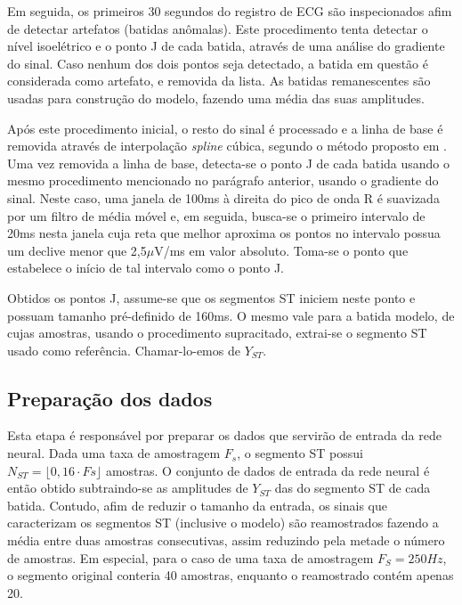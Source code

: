 Em seguida, os primeiros 30 segundos do registro de ECG são inspecionados afim de detectar artefatos (batidas anômalas). Este procedimento tenta detectar o nível isoelétrico e o ponto J de cada batida, através de uma análise do gradiente do sinal. Caso nenhum dos dois pontos seja detectado, a batida em questão é considerada como artefato, e removida da lista. As batidas remanescentes são usadas para construção do modelo, fazendo uma média das suas amplitudes.

Após este procedimento inicial, o resto do sinal é processado e a linha de base é removida através de interpolação \emph{spline} cúbica, segundo o método proposto em \cite{Badilini91}. Uma vez removida a linha de base, detecta-se o ponto J de cada batida usando o mesmo procedimento mencionado no parágrafo anterior, usando o gradiente do sinal. Neste caso, uma janela de 100ms à direita do pico de onda R é suavizada por um filtro de média móvel e, em seguida, busca-se o primeiro intervalo de 20ms nesta janela cuja reta que melhor aproxima os pontos no intervalo possua um declive menor que 2,5$\mu$V/ms em valor absoluto. Toma-se o ponto que estabelece o início de tal intervalo como o ponto J.

Obtidos os pontos J, assume-se que os segmentos ST iniciem neste ponto e possuam tamanho pré-definido de 160ms. O mesmo vale para a batida modelo, de cujas amostras, usando o procedimento supracitado, extrai-se o segmento ST usado como referência. Chamar-lo-emos de $Y_{ST}$.

\subsection{Preparação dos dados}
Esta etapa é responsável por preparar os dados que servirão de entrada da rede neural. Dada uma taxa de amostragem $F_s$, o segmento ST possui $N_{ST} = \lfloor0,16\cdot Fs\rfloor$ amostras. O conjunto de dados de entrada da rede neural é então obtido subtraindo-se as amplitudes de $Y_{ST}$ das do segmento ST de cada batida. Contudo, afim de reduzir o tamanho da entrada, os sinais que caracterizam os segmentos ST (inclusive o modelo) são reamostrados fazendo a média entre duas amostras consecutivas, assim reduzindo pela metade o número de amostras. Em especial, para o caso de uma taxa de amostragem $F_S = 250Hz$, o segmento original conteria 40 amostras, enquanto o reamostrado contém apenas 20.
